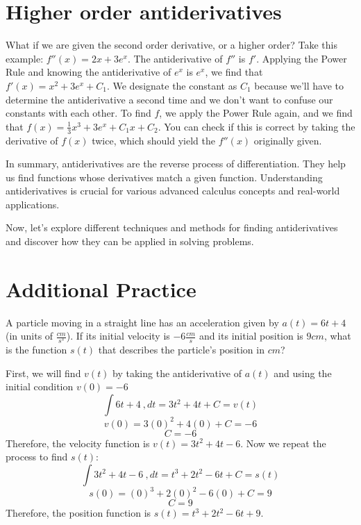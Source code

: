 \section{Higher order antiderivatives}
What if we are given the second order derivative, or a higher order? 
Take this example: $f''(x) = 2x+3e^x$. The antiderivative of $f''$ is 
$f'$. Applying the Power Rule and knowing the antiderivative of $e^x$ 
is $e^x$, we find that $f'(x) = x^2 + 3e^x + C_1$. We designate the 
constant as $C_1$ because we'll have to determine the antiderivative a 
second time and we don't want to confuse our constants with each other.
 To find $f$, we apply the Power Rule again, and we find that $f(x) = 
\frac{1}{3} x^3 + 3e^x + C_1x + C_2$. You can check if this is correct 
by taking the derivative of $f(x)$ twice, which should yield the 
$f''(x)$ originally given. 

In summary, antiderivatives are the reverse process of
differentiation. They help us find functions whose derivatives match a
given function. Understanding antiderivatives is crucial for various
advanced calculus concepts and real-world applications.

Now, let's explore different techniques and methods for finding
antiderivatives and discover how they can be applied in solving
problems.

\section{Additional Practice}

\begin{Exercise}[label=antideriv1]
	A particle moving in a straight line has an acceleration given by 
	$a(t) = 6t + 4$ (in units of $\frac{cm}{s^s}$). If its initial 
	velocity is $-6 \frac{cm}{s}$ and its initial position is $9 cm$, 
	what is the function $s(t)$ that describes the particle's position 
	in $cm$?
\end{Exercise}

\begin{Answer}[ref=antideriv1]
	First, we will find $v(t)$ by taking the antiderivative of $a(t)$ and 
	using the initial condition $v(0) = -6$
	$$\int 6t + 4 \ , dt = 3t^2 + 4t + C = v(t)$$
	$$v(0) = 3(0)^2 + 4(0) + C = -6$$
	$$C = -6$$
	Therefore, the velocity function is $v(t) = 3t^2 + 4t - 6$. Now we 
	repeat the process to find $s(t)$:
	$$\int 3t^2 + 4t - 6 \ , dt = t^3 + 2t^2 - 6t + C = s(t)$$
	$$s(0) = (0)^3 + 2(0)^2 - 6(0) + C = 9$$
	$$C = 9$$
	Therefore, the position function is $s(t) = t^3 + 2t^2 - 6t + 9$. 
\end{Answer}

